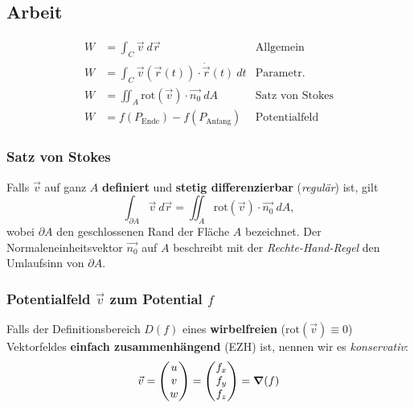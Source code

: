 \subsection{Arbeit}
    \vspace{-0.5em}
    \begin{align*}
        W &= \int_C \vec{v} \ d \vec{r} &\textrm{Allgemein}\\
        W &= \int_C \vec{v} (\vec{r}(t)) \cdot \dot{\vec{r}}(t) \ dt &\textrm{Parametr.}\\
        W &= \iint_{A} \textrm{rot}(\vec{v}) \cdot \vec{n_0} \ dA & \textrm{Satz von Stokes}\\
        W &= f\left(P_{\textrm{Ende}}\right) - f\left(P_{\textrm{Anfang}}\right) &\textrm{Potentialfeld}
    \end{align*}

    \subsubsection{Satz von Stokes} \label{sec:SatzVonStokes}
        Falls $\vec{v}$ auf ganz $A$ \textbf{definiert} und \textbf{stetig differenzierbar} (\textit{regulär}) ist, gilt
        $$
            \int_{\partial A} \vec{v} \ d \vec{r} = \iint_{A} \text{rot}(\vec{v}) \cdot \vec{n_0} \ dA,
        $$
        wobei $\partial A$ den geschlossenen Rand der Fläche $A$ bezeichnet.
        Der Normaleneinheitsvektor $\vec{n_0}$ auf $A$ beschreibt mit der \textit{Rechte-Hand-Regel} den Umlaufsinn von $\partial A$.

    \vfill \null \columnbreak
        
    \subsubsection{Potentialfeld $\vec{v}$ zum Potential $f$ \label{sec:Potentialfeld}}
        Falls der Definitionsbereich $D(f)$ eines \textbf{wirbel\-freien} ($\text{rot}(\vec{v}) \equiv 0$) Vektorfeldes \textbf{einfach zusammenhängend} (EZH) ist, nennen wir es \textit{konservativ}:
        $$ 
        \vec{v} = 
        \begin{pmatrix}
            u\\v\\w
        \end{pmatrix}
        =
        \begin{pmatrix}
            f_x\\f_y\\f_z
        \end{pmatrix}
        = \grad(f)
        $$ 


